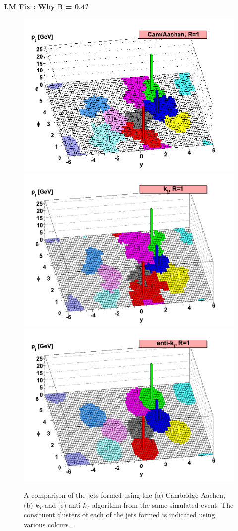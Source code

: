 \textbf{LM Fix : Why R = 0.4?}

\begin{figure}[!ht]
  \captionsetup[subfigure]{aboveskip=-5pt,justification=centering}
  \begin{center}
     {
      \includegraphics[width=0.45\linewidth, angle=0]{figs/Objects/jet_reco_shapes_ca.png}
    }
     {
      \includegraphics[width=0.45\linewidth, angle=0]{figs/Objects/jet_reco_shapes_kt.png}
    }\\
     {
      \includegraphics[width=0.45\linewidth, angle=0]{figs/Objects/jet_reco_shapes_akt.png}
    }

  \end{center}
  \caption[A comparison of the jets formed using the (a) Cambridge-Aachen, (b) $k_T$ and (c) anti-$k_T$ algorithm from the same simulated event.
    The consituent clusters of each of the jets formed is indicated using various colours.]
          {A comparison of the jets formed using the (a) Cambridge-Aachen, (b) $k_T$ and (c) anti-$k_T$ algorithm from the same simulated event.
            The consituent clusters of each of the jets formed is indicated using various colours \cite{obj-jet_reco_salam}.}
  \label{fig:obj-jet_reco_shapes}
\end{figure}


